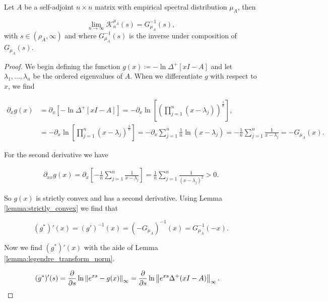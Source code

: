 \begin{theorem} Let $A$ be a self-adjoint $n \times n$ matrix with empirical spectral distribution $\mu_A$, then

    \begin{equation*}
        \lim_{n\to\infty} \mathcal K_n^{\mu_A} (s) = G_{\mu_A}^{-1}(s),
    \end{equation*}
\noindent with $s \in (\rho_A, \infty)$ and where $G_{\mu_A}^{-1}(s)$ is the inverse under composition of $G_{\mu_A}(s)$.
\end{theorem}

\begin{proof}
    
    We begin defining the function $g(x) \coloneqq -\ln \Delta^+[xI - A]$ and let $\lambda_1, \dots, \lambda_n$ be the ordered eigenvalues of $A$. When we differentiate $g$ with respect to $x$, we find 

    \begin{align*}
        \partial_x g(x) &= \partial_x \left[-\ln \Delta^+[xI - A]\right] = -\partial_x \ln\left[ \left(\prod_{j=1}^n (x - \lambda_j) \right)^{\frac1n}\right], \\
        &= -\partial_x \ln \left[ \prod_{j=1}^n (x-\lambda_j)^{\frac1n} \right] = - \partial_x \sum_{j=1}^n \frac1n \ln (x-\lambda_j) = -\frac1n \sum_{j=1}^n  \frac1{x-\lambda_j} = - G_{\mu_A}(x).
    \end{align*}

    For the second derivative we have

    \begin{align*}
        \partial_{xx} g(x) = \partial_x \left[ -\frac1n \sum_{j=1}^n  \frac1{x-\lambda_j} \right] = \frac1n \sum_{j=1}^n \frac{1}{(x-\lambda_j)^2} > 0.
    \end{align*}

    So $g(x)$ is strictly convex and has a second derivative. Using Lemma \ref{lemma:strictly_convex} we find that 

    \begin{equation} \label{eq:inverse_cauchy}
        (g^*)'(x) = (g')^{-1}(x) = (-G_{\mu_A})^{-1}(x) = G_{\mu_A}^{-1}(-x).
    \end{equation}

    Now we find $(g^*)'(x)$ with the aide of Lemma \ref{lemma:legendre_transform_norm}.

    \begin{align*}
        (g^*)'(s) &= \frac{\partial}{\partial s} \ln \left\lVert e^{xs} - g(x) \right\rVert_\infty = \frac{\partial}{\partial s} \ln \left\lVert e^{xs} \Delta^+(xI - A) \right\rVert_\infty.
    \end{align*}


\end{proof}
